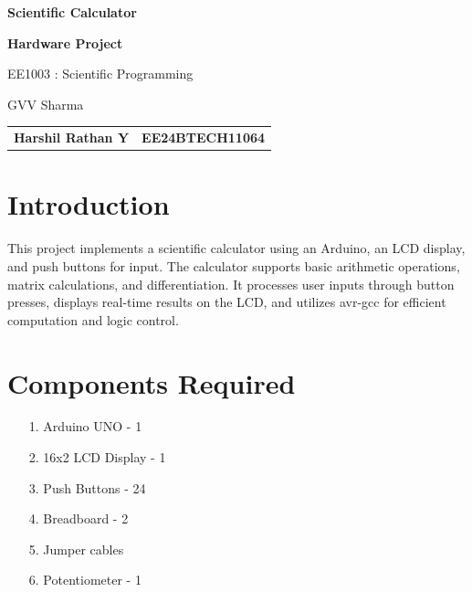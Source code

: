 \documentclass[journal]{IEEEtran}
\begin{document}
\begin{titlepage}
    \centering
    {\Huge \bfseries Scientific Calculator

 \par}
    \vspace{2cm}

   
    {\Large \bfseries Hardware Project \par}
    \vspace{0.5cm}
   
    {\large EE1003 : Scientific Programming \par}
    \vspace{1cm}
    {\large GVV Sharma\par}
    \vspace{3cm}
\begin{tabular}{ll}
    \textbf{Harshil Rathan Y } & \textbf{EE24BTECH11064} \\
\end{tabular}
\end{titlepage}
\newpage
\tableofcontents
\newpage


\vspace{3cm}

\renewcommand{\thefigure}{\theenumi}
\renewcommand{\thetable}{\theenumi}
\setlength{\intextsep}{10pt} %


\renewcommand{\thetable}{\theenumi}
\section{Introduction}
This project implements a scientific calculator using an Arduino, an LCD display, and push buttons for input. The calculator supports basic arithmetic operations, matrix calculations, and differentiation. It processes user inputs through button presses, displays real-time results on the LCD, and utilizes avr-gcc for efficient computation and logic control.

\section{Components Required}
\begin{itemize}
    \item[1.] Arduino UNO - 1 
    \item[2.] 16x2 LCD Display - 1
    \item[3.] Push Buttons - 24 
    \item[4.] Breadboard - 2 
    \item[5.] Jumper cables 
    \item[6.] Potentiometer - 1 
\end{itemize}
\end{document}
